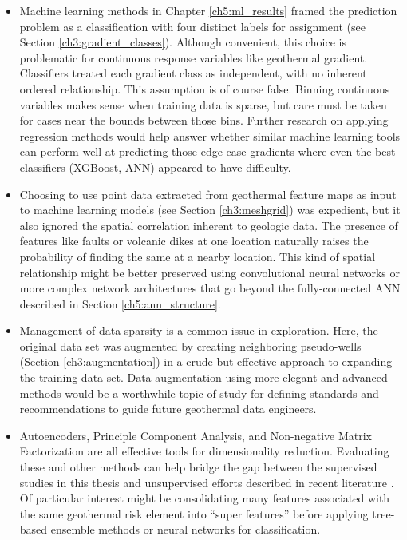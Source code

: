 \begin{itemize}
    \item Machine learning methods in Chapter \ref{ch5:ml_results} framed the prediction problem as a classification with four distinct labels for assignment (see Section \ref{ch3:gradient_classes}). Although convenient, this choice is problematic for continuous response variables like geothermal gradient. Classifiers treated each gradient class as independent, with no inherent ordered relationship. This assumption is of course false. Binning continuous variables makes sense when training data is sparse, but care must be taken for cases near the bounds between those bins. Further research on applying regression methods would help answer whether similar machine learning tools can perform well at predicting those edge case gradients where even the best classifiers (XGBoost, ANN) appeared to have difficulty.
    \item Choosing to use point data extracted from geothermal feature maps as input to machine learning models (see Section \ref{ch3:meshgrid}) was expedient, but it also ignored the spatial correlation inherent to geologic data. The presence of features like faults or volcanic dikes at one location naturally raises the probability of finding the same at a nearby location. This kind of spatial relationship might be better preserved using convolutional neural networks or more complex network architectures that go beyond the fully-connected ANN described in Section \ref{ch5:ann_structure}.
    \item Management of data sparsity is a common issue in exploration. Here, the original data set was augmented by creating neighboring pseudo-wells (Section \ref{ch3:augmentation}) in a crude but effective approach to expanding the training data set. Data augmentation using more elegant and advanced methods would be a worthwhile topic of study for defining standards and recommendations to guide future geothermal data engineers.
    \item Autoencoders, Principle Component Analysis, and Non-negative Matrix Factorization are all effective tools for dimensionality reduction. Evaluating these and other methods can help bridge the gap between the supervised studies in this thesis and unsupervised efforts described in recent literature \citep{pepin_new_2019,smith_characterizing_2021,vesselinov_discovering_2020}. Of particular interest might be consolidating many features associated with the same geothermal risk element into “super features” before applying tree-based ensemble methods or neural networks for classification.

\end{itemize}
